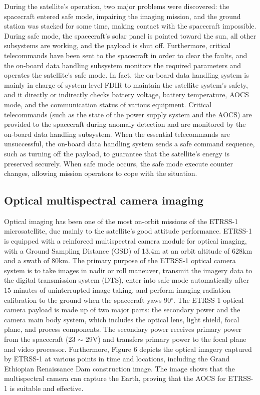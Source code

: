 \documentclass[final,5p,times,twocolumn]{elsarticle}
\begin{document}
During the satellite's operation, two major problems were discovered: the spacecraft entered safe mode, impairing the imaging mission, and the ground station was stacked for some time, making contact with the spacecraft impossible. During safe mode, the spacecraft's solar panel is pointed toward the sun, all other subsystems are working, and the payload is shut off. Furthermore, critical telecommands have been sent to the spacecraft in order to clear the faults, and the on-board data handling subsystem monitors the required parameters and operates the satellite's safe mode. In fact, the on-board data handling system is mainly in charge of system-level FDIR to maintain the satellite system's safety, and it directly or indirectly checks battery voltage, battery temperature, AOCS mode, and the communication status of various equipment. Critical telecommands (such as the state of the power supply system and the AOCS) are provided to the spacecraft during anomaly detection and are monitored by the on-board data handling subsystem. When the essential telecommands are unsuccessful, the on-board data handling system sends a safe command sequence, such as turning off the payload, to guarantee that the satellite's energy is preserved securely. When safe mode occurs, the safe mode execute counter changes, allowing mission operators to cope with the situation.
\subsection{Optical multispectral camera imaging}
Optical imaging has been one of the most on-orbit missions of the ETRSS-1 microsatellite, due mainly to the satellite's good attitude performance. ETRSS-1 is equipped with a reinforced multispectral camera module for optical imaging, with a Ground Sampling Distance (GSD) of 13.4m at an orbit altitude of 628km and a swath of 80km. The primary purpose of the ETRSS-1 optical camera system is to take images in nadir or roll maneuver, transmit the imagery data to the digital transmission system (DTS), enter into safe mode automatically after 15 minutes of uninterrupted image taking, and perform imaging radiation calibration to the ground when the spacecraft yaws 90$^{\circ}$. The ETRSS-1 optical camera payload is made up of two major parts: the secondary power and the camera main body system, which includes the optical lens, light shield, focal plane, and process components.   The secondary power receives primary power from the spacecraft (23 $\sim$ 29V) and transfers primary power to the focal plane and video processor. Furthermore, Figure 6 depicts the optical imagery captured by ETRSS-1 at various points in time and locations, including the Grand Ethiopian Renaissance Dam construction image. The image shows that the multispectral camera can capture the Earth, proving that the AOCS for ETRSS-1 is suitable and effective.
\end{document}
